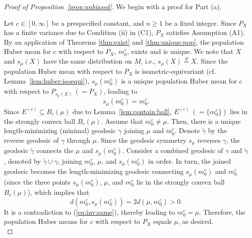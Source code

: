 \documentclass[preprint]{imsart}
\theoremstyle{plain}
\theoremstyle{remark}
\begin{document}
\begin{appendix}
\begin{proof}[Proof of Proposition~\ref{prop:unbiased}]
We begin with a proof for Part (a). 

Let $c \in [0, \infty]$ be a prespecified constant, and $n \ge 1$ be a fixed integer. Since $P_{X}$ has a finite variance due to Condition (ii) in (C1), $P_{X}$ satisfies Assumption (A1). By an application of Theorems \ref{thm:exist} and \ref{thm:unique:pop}, the population Huber mean for $c$ with respect to $P_{X}$, $m^{c}_{0}$, exists and is unique. We note that $X$ and $s_{\mu}(X)$ have the same distribution on $M$, i.e., $s_{\mu}(X) \overset{d}{=} X$. Since the population Huber mean with respect to $P_{X}$ is isometric-equivariant (cf. Lemma~\ref{lem:huber:isoequi}), $s_{\mu}(m^{c}_{0})$ is a unique population Huber mean for $c$ with respect to $P_{s_{\mu}(X)} ~(= P_{X})$, leading to
\begin{equation}\label{eq:inv:same}
s_{\mu}(m^{c}_{0}) = m^{c}_{0}.
\end{equation}
Since $E^{(c)} \subseteq B_{r}(\mu)$ due to Lemma~\ref{lem:contain:ball}, $E^{(c)} ~(=\{m^{c}_{0}\})$ lies in the strongly convex ball $B_{r}(\mu)$. Assume that $m^{c}_{0} \neq \mu$. Then, there is a unique length-minimizing (minimal) geodesic $\gamma$ joining $\mu$ and $m^{c}_{0}$. Denote $\tilde{\gamma}$ by the reverse geodesic of $\gamma$ through $\mu$. Since the geodesic symmetry $s_{\mu}$ reverses $\gamma$, the geodesic $\tilde{\gamma}$ connects the $\mu$ and $s_{\mu}(m^{c}_{0})$. Consider a combined geodesic of $\gamma$ and $\tilde{\gamma}$, denoted by $\tilde{\gamma} \cup \gamma$, joining $m_0^{c}$, $\mu$, and $s_{\mu}(m_0^{c})$ in order. In turn, the joined geodesic becomes the length-minimizing geodesic connecting $s_{\mu}(m^{c}_{0})$ and $m^{c}_{0}$ (since the three points $s_{\mu}(m^{c}_{0})$, $\mu$, and $m^{c}_{0}$ lie in the strongly convex ball $B_{r}(\mu)$), which implies that $$d(m^{c}_{0}, s_{\mu}(m^{c}_{0})) = 2 d(\mu, m^{c}_{0}) > 0.$$ It is a contradiction to (\ref{eq:inv:same}), thereby leading to $m^{c}_{0} = \mu$. Therefore, the population Huber means for $c$ with respect to $P_{X}$ equals $\mu$, as desired. \\



\end{proof}
\end{appendix}
\end{document}
